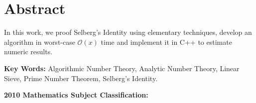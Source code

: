 \chapter*{Abstract}

In this work, we proof Selberg's Identity using elementary techniques,
develop an algorithm in worst-case \(\mathcal{O}(x)\) time and
implement it in C++ to estimate numeric results.

\bigskip
\textbf{Key Words:}
Algorithmic Number Theory,
Analytic Number Theory,
Linear Sieve,
Prime Number Theorem,
Selberg's Identity.

\bigskip
\textbf{2010 Mathematics Subject Classification:}

\setcounter{page}{4}
